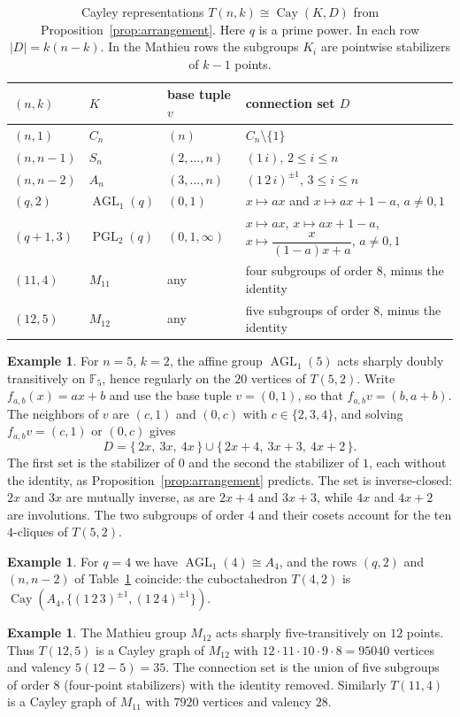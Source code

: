 \documentclass[12pt,letterpaper]{article}
\numberwithin{equation}{section}
\theoremstyle{definition}
\newtheorem{example}[theorem]{Example}
\DeclareMathOperator{\agll}{AGL}
\DeclareMathOperator{\pgll}{PGL}
\DeclareMathOperator{\cayy}{Cay}
\begin{document}
\begin{table}[ht]
\centering\small
\begin{tabular}{@{}llll@{}}\toprule
$(n,k)$ & $K$ & base tuple $v$ & connection set $D$\\\midrule
$(n,1)$ & $C_n$ & $(n)$ & $C_n\setminus\{1\}$\\
$(n,n-1)$ & $S_n$ & $(2,\ldots,n)$ & $(1\,i)$, $2\leq i\leq n$\\
$(n,n-2)$ & $A_n$ & $(3,\ldots,n)$ & $(1\,2\,i)^{\pm1}$, $3\leq i\leq n$\\
$(q,2)$ & $\agll_1(q)$ & $(0,1)$ & $x\mapsto ax$ and $x\mapsto ax+1-a$, $a\neq0,1$\\
$(q+1,3)$ & $\pgll_2(q)$ & $(0,1,\infty)$ & $x\mapsto ax$, $x\mapsto ax+1-a$, $x\mapsto \dfrac{x}{(1-a)x+a}$, $a\neq0,1$\\[4pt]
$(11,4)$ & $M_{11}$ & any & four subgroups of order $8$, minus the identity\\
$(12,5)$ & $M_{12}$ & any & five subgroups of order $8$, minus the identity\\
\bottomrule
\end{tabular}
\caption{Cayley representations $T(n,k)\cong\cayy(K,D)$ from Proposition~\ref{prop:arrangement}. Here $q$ is a prime power. In each row $|D|=k(n-k)$. In the Mathieu rows the subgroups $K_i$ are pointwise stabilizers of $k-1$ points.}\label{tab:cayley}
\end{table}
\begin{example}\label{ex:agl5}
For $n=5$, $k=2$, the affine group $\agll_1(5)$ acts sharply doubly transitively on $\mathbb F_5$, hence regularly on the $20$ vertices of $T(5,2)$. Write $f_{a,b}(x)=ax+b$ and use the base tuple $v=(0,1)$, so that $f_{a,b}v=(b,a+b)$. The neighbors of $v$ are $(c,1)$ and $(0,c)$ with $c\in\{2,3,4\}$, and solving $f_{a,b}v=(c,1)$ or $(0,c)$ gives
\[
D=\{\,2x,\ 3x,\ 4x\,\}\cup\{\,2x+4,\ 3x+3,\ 4x+2\,\}.
\]
The first set is the stabilizer of $0$ and the second the stabilizer of $1$, each without the identity, as Proposition~\ref{prop:arrangement} predicts. The set is inverse-closed: $2x$ and $3x$ are mutually inverse, as are $2x+4$ and $3x+3$, while $4x$ and $4x+2$ are involutions. The two subgroups of order $4$ and their cosets account for the ten $4$-cliques of $T(5,2)$.
\end{example}
\begin{example}
For $q=4$ we have $\agll_1(4)\cong A_4$, and the rows $(q,2)$ and $(n,n-2)$ of Table~\ref{tab:cayley} coincide: the cuboctahedron $T(4,2)$ is $\cayy(A_4,\{(1\,2\,3)^{\pm1},(1\,2\,4)^{\pm1}\})$.
\end{example}
\begin{example}\label{ex:m12}
The Mathieu group $M_{12}$ acts sharply five-transitively on $12$ points. Thus $T(12,5)$ is a Cayley graph of $M_{12}$ with $12\cdot11\cdot10\cdot9\cdot8=95040$ vertices and valency $5(12-5)=35$. The connection set is the union of five subgroups of order $8$ (four-point stabilizers) with the identity removed. Similarly $T(11,4)$ is a Cayley graph of $M_{11}$ with $7920$ vertices and valency $28$.
\end{example}
\end{document}
